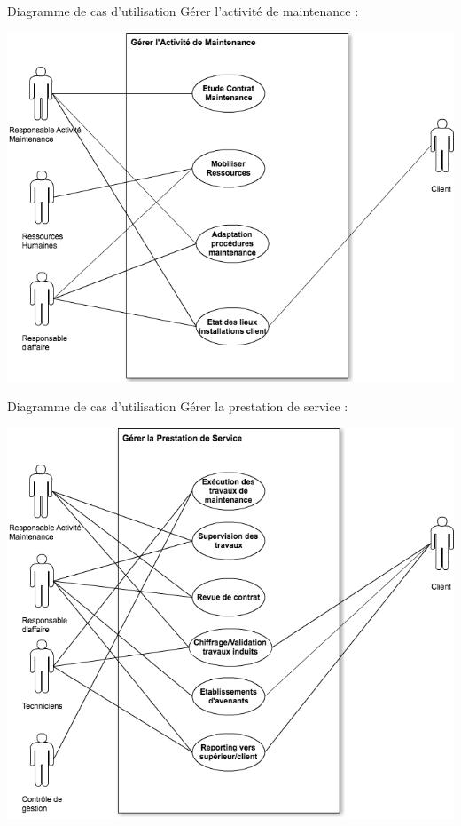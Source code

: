 Diagramme de cas d'utilisation Gérer l'activité de maintenance :
\begin {center}
\includegraphics[width=\textwidth]{png_generaux/DCUGererActiMaintenance.png}
\end {center}

Diagramme de cas d'utilisation Gérer la prestation de service :
\begin {center}
\includegraphics[width=\textwidth]{png_generaux/DCUGererPrestationService.png}
\end {center}

